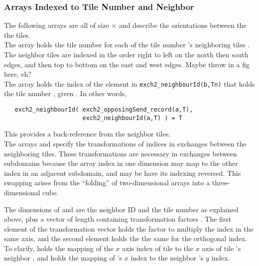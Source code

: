 \subsubsection{Arrays Indexed to Tile Number and Neighbor}

The following arrays are all of size
$\times$ and describe the
orientations between the the tiles. \\

The array  holds the tile number
 for each of the tile number 's neighboring tiles
.  The neighbor tiles are indexed
 in the order right to left on the
north then south edges, and then top to bottom on the east and west
edges.  Maybe throw in a fig here, eh?  \\

\sloppy The  array holds the
index  of the element in \texttt{exch2\_neighbourId(b,Tn)}
that holds the tile number , given
.  In other words,
\begin{verbatim}
   exch2_neighbourId( exch2_opposingSend_record(a,T),
                      exch2_neighbourId(a,T) ) = T
\end{verbatim}
This provides a back-reference from the neighbor tiles. \\

The arrays  and
 specify the transformations of indices
in exchanges between the neighboring tiles.  These transformations are
necessary in exchanges between subdomains because the array index in
one dimension may map to the other index in an adjacent subdomain, and
may be have its indexing reversed. This swapping arises from the
``folding'' of two-dimensional arrays into a three-dimensional cube.

The dimensions of  and 
are the neighbor ID  and the tile number  as explained
above, plus a vector of length  containing transformation
factors .  The first element of the transformation vector
holds the factor to multiply the index in the same axis, and the
second element holds the the same for the orthogonal index.  To
clarify,  holds the mapping of the $x$ axis
index of tile  to the $x$ axis of tile 's neighbor
, and  holds the mapping of 's
$x$ index to the neighbor 's $y$ index. \\
 

